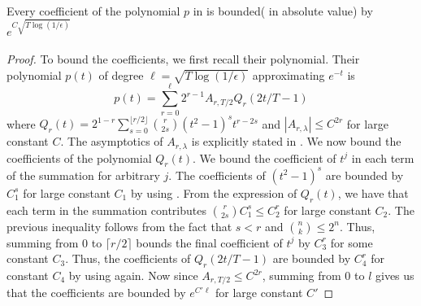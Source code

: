 \documentclass{theoretics}
\newcommand{\1}{\Ind}
\newcommand{\lamdba}{\lambda}
\begin{document}
\begin{lemma}
    Every coefficient of the polynomial $p$ in  is bounded( in absolute value) by $e^{C\sqrt{T\log(1/\epsilon)}}$
\end{lemma}
\begin{proof}
To bound the coefficients, we first recall their polynomial. Their polynomial $p(t)$ of degree $\ell=\sqrt{T\log(1/\epsilon)}$ approximating $e^{-t}$ is 
\[
p(t)=\sum_{r=0}^{\ell}2^{r-1}A_{r,T/2}Q_r(2t/T-1)    
\] where $Q_r(t)=2^{1-r}\sum_{s=0}^{\lfloor r/2\rfloor}\binom{r}{2s}(t^2-1)^{s}t^{r-2s}$ and $|A_{r,\lamdba}|\leq C^{2r}$ for large constant $C$. The asymptotics of $A_{r,\lambda}$ is explicitly stated in \cite{AA22}. We now bound the coefficients of the polynomial $Q_r(t)$. We bound the coefficient of $t^j$ in each term of the summation for arbitrary $j$. The coefficients of $(t^2-1)^s$ are bounded by $C_1^{s}$ for large constant $C_1$ by using .  From the expression of $Q_r(t)$, we have that each term in the summation contributes $\binom{r}{2s}C_1^{s}\leq C_2^{r}$ for large constant $C_2$. The previous inequality follows from the fact that $s<r$ and $\binom{n}{k}\leq 2^n$. Thus, summing from $0$ to $\lceil r/2\rceil$ bounds the final coefficient of $t^j$ by $C_3^{r}$ for some constant $C_3$. Thus, the coefficients of $Q_r(2t/T-1)$ are bounded by $C_4^r$ for constant $C_4$ by using  again. Now since $A_{r,T/2}\leq C^{2r}$, summing from $0$ to $l$ gives us that the coefficients are bounded by $e^{C'\ell}$ for large constant $C'$
\end{proof}
\end{document}

